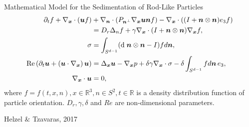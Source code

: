 \begin{frame}{Mathematical Model for the Sedimentation of Rod-Like Particles}
	\scriptsize
	\begin{align*}
		\partial_t f+\nabla_{\boldsymbol{x}} \cdot(\boldsymbol{u} f) & +\nabla_{\boldsymbol{n}} \cdot\left(P_{\boldsymbol{n}^{\perp}} \nabla_{\boldsymbol{x}} \boldsymbol{u} \boldsymbol{n} f\right)-\nabla_{\boldsymbol{x}} \cdot\left((I+\boldsymbol{n} \otimes \boldsymbol{n}) e_3 f\right) \\
		& =D_r \Delta_n f+\gamma \nabla_{\boldsymbol{x}} \cdot(I+\boldsymbol{n} \otimes \boldsymbol{n}) \nabla_{\boldsymbol{x}} f, \notag \\
		\sigma & =\int_{S^{d-1}}(\text{d} \; \boldsymbol{n} \otimes \boldsymbol{n}-I) f d \boldsymbol{n},  \\
		\operatorname{Re}\left(\partial_t \boldsymbol{u}+\left(\boldsymbol{u} \cdot \nabla_{\boldsymbol{x}}\right) \boldsymbol{u}\right) & =\Delta_{\boldsymbol{x}} \boldsymbol{u}-\nabla_{\boldsymbol{x}} p+\delta \gamma \nabla_{\boldsymbol{x}} \cdot \sigma-\delta \int_{S^{d-1}} f d \boldsymbol{n} \, e_3, \\
		\nabla_{\boldsymbol{x}} \cdot \boldsymbol{u} & =0,
	\end{align*}
	where $f = f(t, x, n), x \in \mathbb{R}^3 , n \in  S^2, t \in \mathbb{R}$ is a density distribution function of particle orientation. $D_r, \gamma, \delta$ and $Re$ are non-dimensional parameters.
	
	\begin{beamercolorbox}[sep=1em,wd=\linewidth,right]{}
		\tiny{Helzel $\&$ Tzavaras, 2017}
	\end{beamercolorbox}
\end{frame}

